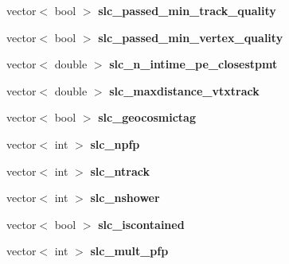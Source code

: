\begin{DoxyCompactItemize}
\item 
\hypertarget{classUBXSecEvent_aab3be8887f062f848104113097b27ad5}{vector$<$ bool $>$ {\bfseries slc\-\_\-passed\-\_\-min\-\_\-track\-\_\-quality}}\label{classUBXSecEvent_aab3be8887f062f848104113097b27ad5}

\item 
\hypertarget{classUBXSecEvent_af2bdc55d1c56cea1c4e3104e262f029c}{vector$<$ bool $>$ {\bfseries slc\-\_\-passed\-\_\-min\-\_\-vertex\-\_\-quality}}\label{classUBXSecEvent_af2bdc55d1c56cea1c4e3104e262f029c}

\item 
\hypertarget{classUBXSecEvent_a8234ab4e219c1355370b5f141ad10211}{vector$<$ double $>$ {\bfseries slc\-\_\-n\-\_\-intime\-\_\-pe\-\_\-closestpmt}}\label{classUBXSecEvent_a8234ab4e219c1355370b5f141ad10211}

\item 
\hypertarget{classUBXSecEvent_afbcefec1936192c7a46b3414d7f3067d}{vector$<$ double $>$ {\bfseries slc\-\_\-maxdistance\-\_\-vtxtrack}}\label{classUBXSecEvent_afbcefec1936192c7a46b3414d7f3067d}

\item 
\hypertarget{classUBXSecEvent_a5bf2adbb96dee74effb2efb02ca73ca6}{vector$<$ bool $>$ {\bfseries slc\-\_\-geocosmictag}}\label{classUBXSecEvent_a5bf2adbb96dee74effb2efb02ca73ca6}

\item 
\hypertarget{classUBXSecEvent_a9e7b76e3075ee41f14cb93f895a28281}{vector$<$ int $>$ {\bfseries slc\-\_\-npfp}}\label{classUBXSecEvent_a9e7b76e3075ee41f14cb93f895a28281}

\item 
\hypertarget{classUBXSecEvent_a536003dadab39e399dcfc6aebea8cd17}{vector$<$ int $>$ {\bfseries slc\-\_\-ntrack}}\label{classUBXSecEvent_a536003dadab39e399dcfc6aebea8cd17}

\item 
\hypertarget{classUBXSecEvent_a9ae1d6293a6f915b13979f2e88513966}{vector$<$ int $>$ {\bfseries slc\-\_\-nshower}}\label{classUBXSecEvent_a9ae1d6293a6f915b13979f2e88513966}

\item 
\hypertarget{classUBXSecEvent_aed6d8542df31ecee430516b2db5807a5}{vector$<$ bool $>$ {\bfseries slc\-\_\-iscontained}}\label{classUBXSecEvent_aed6d8542df31ecee430516b2db5807a5}

\item 
\hypertarget{classUBXSecEvent_afb9baad67b754eceb3d2b472f9bd969f}{vector$<$ int $>$ {\bfseries slc\-\_\-mult\-\_\-pfp}}\label{classUBXSecEvent_afb9baad67b754eceb3d2b472f9bd969f}


\end{DoxyCompactItemize}
